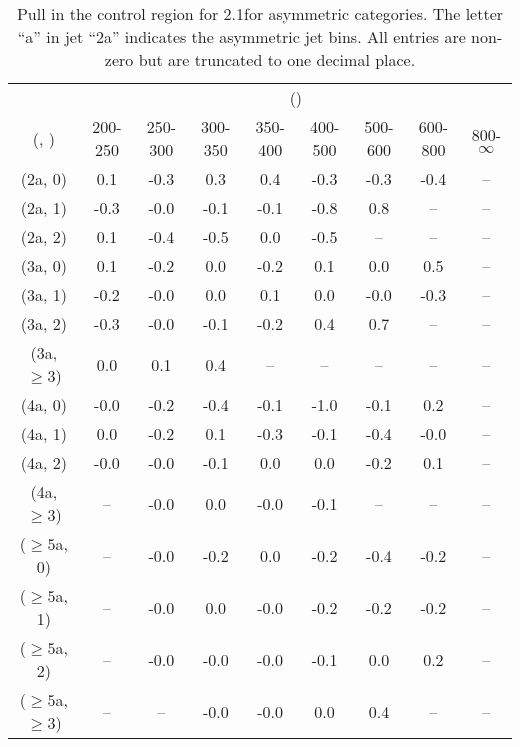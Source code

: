 \begin{table}[h!]
\tiny
\centering
\caption{Pull in the \mj control region for 2.1\ifb for asymmetric categories. The letter ``a'' in jet \eg ``2a''  indicates the asymmetric jet bins. All entries are non-zero but are truncated to one decimal place.\label{tab:pullsepnaive_mu_ewk_asym}}
\begin{tabular}
{ccccccccc}
	\hline\hline
	& \multicolumn{8}{c}{\scalht (\gev)} \\ 
	 (\njet,  \nb) & 200-250 & 250-300 & 300-350 & 350-400 & 400-500 & 500-600 & 600-800 & 800-$\infty$ \\ [0.8ex] 
\hline
	(2a, 0) & 0.1 & -0.3 & 0.3 & 0.4 & -0.3 & -0.3 & -0.4 & -- \\[0.5ex] 
	(2a, 1) & -0.3 & -0.0 & -0.1 & -0.1 & -0.8 & 0.8 & -- & -- \\[0.5ex] 
	(2a, 2) & 0.1 & -0.4 & -0.5 & 0.0 & -0.5 & -- & -- & -- \\[0.5ex] 
	(3a, 0) & 0.1 & -0.2 & 0.0 & -0.2 & 0.1 & 0.0 & 0.5 & -- \\[0.5ex] 
	(3a, 1) & -0.2 & -0.0 & 0.0 & 0.1 & 0.0 & -0.0 & -0.3 & -- \\[0.5ex] 
	(3a, 2) & -0.3 & -0.0 & -0.1 & -0.2 & 0.4 & 0.7 & -- & -- \\[0.5ex] 
	(3a, $\ge3$) & 0.0 & 0.1 & 0.4 & -- & -- & -- & -- & -- \\[0.5ex] 
	(4a, 0) & -0.0 & -0.2 & -0.4 & -0.1 & -1.0 & -0.1 & 0.2 & -- \\[0.5ex] 
	(4a, 1) & 0.0 & -0.2 & 0.1 & -0.3 & -0.1 & -0.4 & -0.0 & -- \\[0.5ex] 
	(4a, 2) & -0.0 & -0.0 & -0.1 & 0.0 & 0.0 & -0.2 & 0.1 & -- \\[0.5ex] 
	(4a, $\ge3$) & -- & -0.0 & 0.0 & -0.0 & -0.1 & -- & -- & -- \\[0.5ex] 
	($\ge5$a, 0) & -- & -0.0 & -0.2 & 0.0 & -0.2 & -0.4 & -0.2 & -- \\[0.5ex] 
	($\ge5$a, 1) & -- & -0.0 & 0.0 & -0.0 & -0.2 & -0.2 & -0.2 & -- \\[0.5ex] 
	($\ge5$a, 2) & -- & -0.0 & -0.0 & -0.0 & -0.1 & 0.0 & 0.2 & -- \\[0.5ex] 
	($\ge5$a, $\ge3$) & -- & -- & -0.0 & -0.0 & 0.0 & 0.4 & -- & -- \\[0.5ex] 
	\hline
	\hline
\end{tabular}
\end{table}
